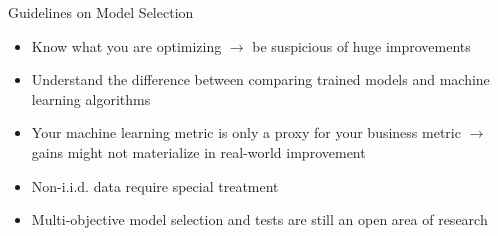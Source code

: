 \documentclass[11pt,compress,t,notes=noshow, aspectratio=169, xcolor=table]{beamer}
\begin{document}
\begin{frame}{Guidelines on Model Selection}
    \vfill
    \begin{itemize}
        \item Know what you are optimizing $\rightarrow$ be suspicious of huge improvements
        \item Understand the difference between comparing trained models and machine learning algorithms
        \item Your machine learning metric is only a proxy for your business metric $\rightarrow$ gains might not materialize in real-world improvement
        \item Non-i.i.d. data require special treatment
        \item Multi-objective model selection and tests are still an open area of research
    \end{itemize}
    \vfill
\end{frame}


\endlecture
\end{document}
